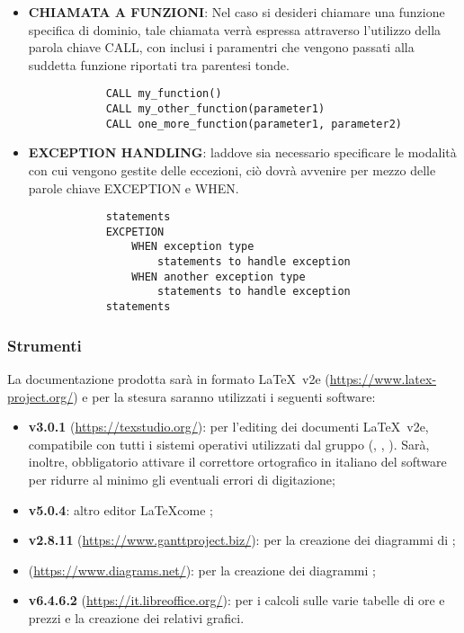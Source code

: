 \begin{itemize}
	\item \textbf{CHIAMATA A FUNZIONI}: Nel caso si desideri chiamare una funzione specifica di dominio, tale chiamata verrà espressa attraverso l'utilizzo della parola chiave CALL, con inclusi i paramentri che vengono passati alla suddetta funzione riportati tra parentesi tonde.
		\begin{Verbatim}
			CALL my_function()
			CALL my_other_function(parameter1)
			CALL one_more_function(parameter1, parameter2)
		\end{Verbatim}
		
	\item \textbf{EXCEPTION HANDLING}: laddove sia necessario specificare le modalità con cui vengono gestite delle eccezioni, ciò dovrà avvenire per mezzo delle parole chiave EXCEPTION e WHEN.
		\begin{Verbatim}
			statements
			EXCPETION
				WHEN exception type
					statements to handle exception
				WHEN another exception type
					statements to handle exception
			statements
		\end{Verbatim}
	\end{itemize}
		
	\subsubsection{Strumenti}
	La documentazione prodotta sarà in formato \LaTeX\ v2e (\url{https://www.latex-project.org/}) e per la stesura saranno utilizzati i seguenti software:
	\begin{itemize}
		\item \textbf{ v3.0.1} (\url{https://texstudio.org/}): per l'editing dei documenti \LaTeX\ v2e, compatibile con tutti i sistemi operativi utilizzati dal gruppo (, , ). Sarà, inoltre, obbligatorio attivare il correttore ortografico in italiano del software per ridurre al minimo gli eventuali errori di digitazione;
		\item \textbf{ v5.0.4}: altro editor \LaTeX come ;
		\item \textbf{ v2.8.11} (\url{https://www.ganttproject.biz/}): per la creazione dei diagrammi di ;
		\item \textbf{} (\url{https://www.diagrams.net/}): per la creazione dei diagrammi ;
		\item \textbf{ v6.4.6.2} (\url{https://it.libreoffice.org/}): per i calcoli sulle varie tabelle di ore  e prezzi e la creazione dei relativi grafici.
	\end{itemize}

